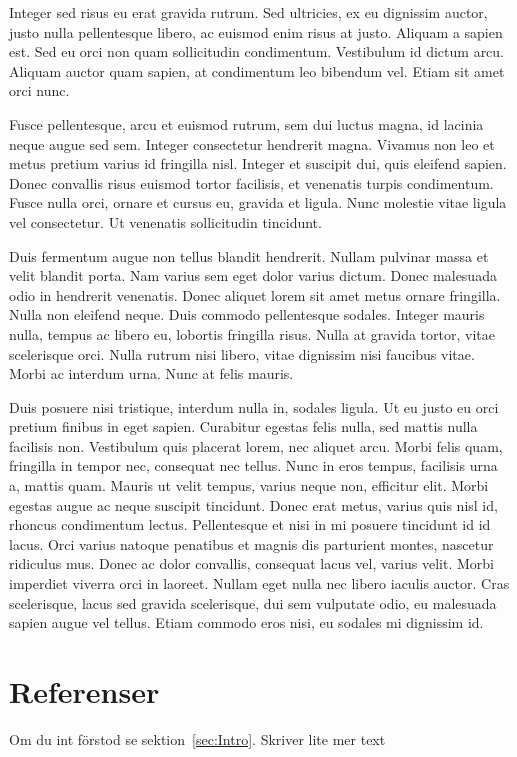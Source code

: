 \documentclass[a4paper,10pt]{article}
\begin{document}
Integer sed risus eu erat gravida rutrum. Sed ultricies, ex eu dignissim auctor, justo nulla pellentesque libero, ac euismod enim risus at justo. Aliquam a sapien est. Sed eu orci non quam sollicitudin condimentum. Vestibulum id dictum arcu. Aliquam auctor quam sapien, at condimentum leo bibendum vel. Etiam sit amet orci nunc.

Fusce pellentesque, arcu et euismod rutrum, sem dui luctus magna, id lacinia neque augue sed sem. Integer consectetur hendrerit magna. Vivamus non leo et metus pretium varius id fringilla nisl. Integer et suscipit dui, quis eleifend sapien. Donec convallis risus euismod tortor facilisis, et venenatis turpis condimentum. Fusce nulla orci, ornare et cursus eu, gravida et ligula. Nunc molestie vitae ligula vel consectetur. Ut venenatis sollicitudin tincidunt.

Duis fermentum augue non tellus blandit hendrerit. Nullam pulvinar massa et velit blandit porta. Nam varius sem eget dolor varius dictum. Donec malesuada odio in hendrerit venenatis. Donec aliquet lorem sit amet metus ornare fringilla. Nulla non eleifend neque. Duis commodo pellentesque sodales. Integer mauris nulla, tempus ac libero eu, lobortis fringilla risus. Nulla at gravida tortor, vitae scelerisque orci. Nulla rutrum nisi libero, vitae dignissim nisi faucibus vitae. Morbi ac interdum urna. Nunc at felis mauris.

Duis posuere nisi tristique, interdum nulla in, sodales ligula. Ut eu justo eu orci pretium finibus in eget sapien. Curabitur egestas felis nulla, sed mattis nulla facilisis non. Vestibulum quis placerat lorem, nec aliquet arcu. Morbi felis quam, fringilla in tempor nec, consequat nec tellus. Nunc in eros tempus, facilisis urna a, mattis quam. Mauris ut velit tempus, varius neque non, efficitur elit. Morbi egestas augue ac neque suscipit tincidunt. Donec erat metus, varius quis nisl id, rhoncus condimentum lectus. Pellentesque et nisi in mi posuere tincidunt id id lacus. Orci varius natoque penatibus et magnis dis parturient montes, nascetur ridiculus mus. Donec ac dolor convallis, consequat lacus vel, varius velit. Morbi imperdiet viverra orci in laoreet. Nullam eget nulla nec libero iaculis auctor. Cras scelerisque, lacus sed gravida scelerisque, dui sem vulputate odio, eu malesuada sapien augue vel tellus. Etiam commodo eros nisi, eu sodales mi dignissim id.

\section{Referenser}
Om du int förstod se sektion~\ref{sec:Intro}.
Skriver lite mer text
\end{document}
